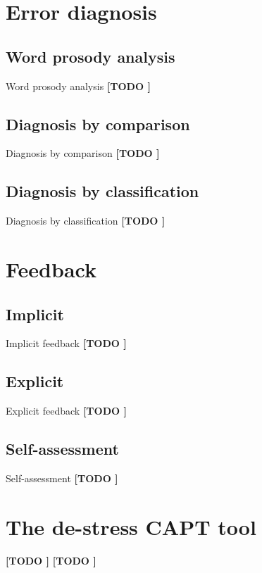 \documentclass[xcolor={dvipsnames}]{beamer}
\newcommand{\TODO}[1]{{\color{red}\textbf{[TODO #1]}}}
\begin{document}

\section{Error diagnosis}
	\subsection{Word prosody analysis}
		\begin{frame}{Word prosody analysis}
		\TODO{}
		\end{frame}		
	\subsection{Diagnosis by comparison}
		\begin{frame}{Diagnosis by comparison}
		\TODO{}
		\end{frame}
	\subsection{Diagnosis by classification}
		\begin{frame}{Diagnosis by classification}
		\TODO{}
		\end{frame}

\section{Feedback}
	\subsection{Implicit}
		\begin{frame}{Implicit feedback}
		\TODO{}
		\end{frame}
	\subsection{Explicit}
		\begin{frame}{Explicit feedback}
		\TODO{}
		\end{frame}
	\subsection{Self-assessment}
		\begin{frame}{Self-assessment}
		\TODO{}
		\end{frame}

	
\section{The de-stress CAPT tool }
		\begin{frame}{\TODO{}}
		\TODO{}
		\end{frame}
\end{document}
